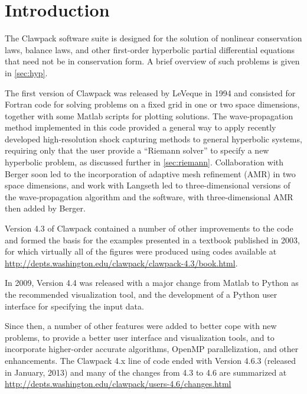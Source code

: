 %
%
%

\section{Introduction}\label{sec:intro}

The Clawpack software suite \cite{clawpack}
is designed for the solution of nonlinear conservation laws, balance laws,
and other first-order hyperbolic partial differential
equations that need not be in conservation form. 
A brief overview of such problems is given in \cref{sec:hyp}.

The first version of Clawpack was released by LeVeque in 1994 
\cite{clawpack-v1} and consisted for Fortran code for solving problems on a
fixed grid in one or two space dimensions, together with some Matlab scripts
for plotting solutions. The wave-propagation method implemented
in this code provided a general way to apply recently developed
high-resolution shock capturing methods to general hyperbolic systems,
requiring only that the user provide a ``Riemann solver'' to specify a new
hyperbolic problem, as discussed further in \cref{sec:riemann}.  
Collaboration with Berger \cite{mjb-rjl:amrclaw} 
soon led to the incorporation of adaptive mesh refinement (AMR) in two space
dimensions, and work with Langseth \cite{jol-rjl:3d, jol:thesis}
led to three-dimensional versions of the wave-propagation algorithm and the
software, with three-dimensional AMR then added by Berger.

Version 4.3 of Clawpack contained a number of other improvements to the code
and formed the basis for the examples presented in a textbook \cite{rjl:fvmhp}
published in 2003, for which virtually all of the figures were
produced using codes available at
\url{http://depts.washington.edu/clawpack/clawpack-4.3/book.html}.

In 2009, Version 4.4 was released with a major change from Matlab
to Python as the recommended visualization tool, and the development
of a Python user interface for specifying the input data.

Since then, a number of other features were added to better cope with new
problems, to provide a better user interface and visualization tools, and to
incorporate higher-order accurate algorithms, OpenMP parallelization, and
other enhancements. The Clawpack 4.x line of code ended with Version 4.6.3
(released in January, 2013) and
many of the changes from 4.3 to 4.6 are summarized at
\url{http://depts.washington.edu/clawpack/users-4.6/changes.html}

